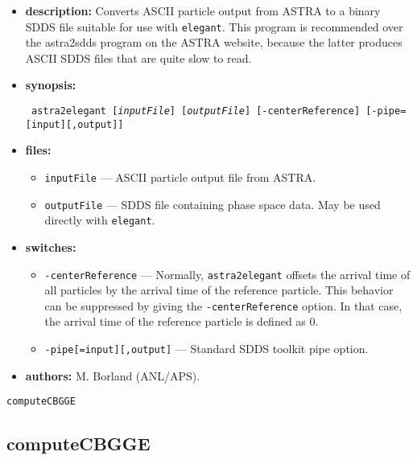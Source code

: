 \documentclass[11pt]{article}
\begin{document}
\begin{itemize}
\item {\bf description:}   Converts ASCII particle output from ASTRA to a binary
SDDS file suitable for use with {\tt elegant}.  This program is recommended over
the astra2sdds program on the ASTRA website, because the latter produces ASCII SDDS
files that are quite slow to read.

\item {\bf synopsis:}
\begin{flushleft}{\tt
astra2elegant [{\em inputFile}] [{\em outputFile}] [-centerReference] [-pipe=[input][,output]]
}\end{flushleft}

\item {\bf files:}
\begin{itemize}
\item {\tt inputFile} --- ASCII particle output file from ASTRA.
\item {\tt outputFile} --- SDDS file containing phase space data. May be used directly with 
{\tt elegant}.
\end{itemize}

\item {\bf switches:}
\begin{itemize}
\item {\tt -centerReference} --- Normally, {\tt astra2elegant} offsets the arrival time of all particles
  by the arrival time of the reference particle.  This behavior can be suppressed by giving the
  {\tt -centerReference} option.  In that case, the arrival time of the reference particle is defined
  as 0.
\item {\tt -pipe[=input][,output]} --- Standard SDDS toolkit pipe option.
\end{itemize}

\item {\bf authors:} M. Borland (ANL/APS).

\end{itemize}

\newpage
\begin{center}{\Large\verb|computeCBGGE|}\end{center}
\subsection{computeCBGGE}
\end{document}
